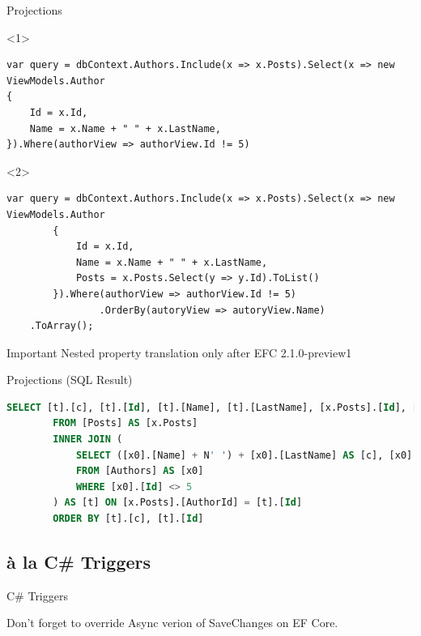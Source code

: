 \documentclass{bredelebeamer}
\begin{document}
\begin{frame}[fragile]{Projections}
    \begin{onlyenv}<1>
        \begin{lstlisting}
var query = dbContext.Authors.Include(x => x.Posts).Select(x => new ViewModels.Author
{
    Id = x.Id,
    Name = x.Name + " " + x.LastName,
}).Where(authorView => authorView.Id != 5)
        \end{lstlisting}
    \end{onlyenv}
    \begin{onlyenv}<2>
        \begin{lstlisting}
var query = dbContext.Authors.Include(x => x.Posts).Select(x => new ViewModels.Author
        {
            Id = x.Id,
            Name = x.Name + " " + x.LastName,
            Posts = x.Posts.Select(y => y.Id).ToList()
        }).Where(authorView => authorView.Id != 5)
                .OrderBy(autoryView => autoryView.Name)
    .ToArray();
        \end{lstlisting}
        \begin{alertblock}{Important}
            Nested property translation only after EFC 2.1.0-preview1
        \end{alertblock}
    \end{onlyenv}
\end{frame}
\begin{frame}[fragile]{Projections (SQL Result)}
    \begin{lstlisting}[language=SQL]
        SELECT [t].[c], [t].[Id], [t].[Name], [t].[LastName], [x.Posts].[Id], [x.Posts].[AuthorId]
        FROM [Posts] AS [x.Posts]
        INNER JOIN (
            SELECT ([x0].[Name] + N' ') + [x0].[LastName] AS [c], [x0].[Id], [x0].[Name], [x0].[LastName]
            FROM [Authors] AS [x0]
            WHERE [x0].[Id] <> 5
        ) AS [t] ON [x.Posts].[AuthorId] = [t].[Id]
        ORDER BY [t].[c], [t].[Id]
    \end{lstlisting}
\end{frame}
\subsection{à la C\# Triggers}
\begin{frame}{C\# Triggers}
    
    \pause
    Don't forget to override Async verion of SaveChanges on EF Core.

\end{frame}
\end{document}
